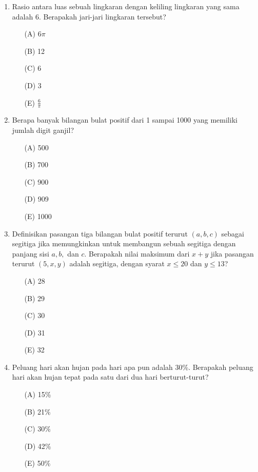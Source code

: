 \documentclass[10pt]{article}
\begin{document}
\begin{enumerate}
    \item Rasio antara luas sebuah lingkaran dengan keliling lingkaran yang sama adalah 6. Berapakah jari-jari lingkaran tersebut?
    \begin{itemize}
        \item[(A)] $6\pi$
        \item[(B)] 12
        \item[(C)] 6
        \item[(D)] 3
        \item[(E)] $\frac{6}{\pi}$
    \end{itemize}

    \item Berapa banyak bilangan bulat positif dari 1 sampai 1000 yang memiliki jumlah digit ganjil?
    \begin{itemize}
        \item[(A)] 500
        \item[(B)] 700
        \item[(C)] 900
        \item[(D)] 909
        \item[(E)] 1000
    \end{itemize}

    \item Definisikan pasangan tiga bilangan bulat positif terurut $(a, b, c)$ sebagai segitiga jika memungkinkan untuk membangun sebuah segitiga dengan panjang sisi $a, b,$ dan $c$. Berapakah nilai maksimum dari $x+y$ jika pasangan terurut $(5, x, y)$ adalah segitiga, dengan syarat $x \le 20$ dan $y \le 13$?
    \begin{itemize}
        \item[(A)] 28
        \item[(B)] 29
        \item[(C)] 30
        \item[(D)] 31
        \item[(E)] 32
    \end{itemize}

    \item Peluang hari akan hujan pada hari apa pun adalah 30\%. Berapakah peluang hari akan hujan tepat pada satu dari dua hari berturut-turut?
    \begin{itemize}
        \item[(A)] 15\%
        \item[(B)] 21\%
        \item[(C)] 30\%
        \item[(D)] 42\%
        \item[(E)] 50\%
    \end{itemize}


\end{enumerate}
\end{document}
